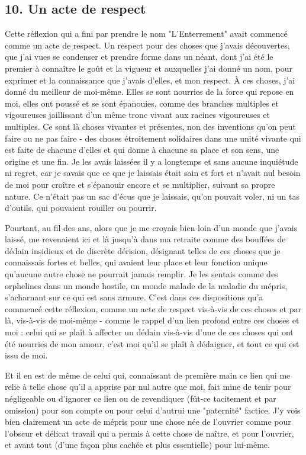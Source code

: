 \subsection{10. Un acte de respect}

Cette réflexion qui a fini par prendre le nom "L'Enterrement" avait commencé comme un acte de respect. Un respect pour des choses que j'avais découvertes, que j'ai vues se condenser et prendre forme dans un néant, dont j'ai été le premier à connaître le goût et la vigueur et auxquelles j'ai donné un nom, pour exprimer et la connaissance que j'avais d'elles, et mon respect. À ces choses, j'ai donné du meilleur de moi-même. Elles se sont nourries de la force qui repose en moi, elles ont poussé et se sont épanouies, comme des branches multiples et vigoureuses jaillissant d'un même tronc vivant aux racines vigoureuses et multiples. Ce sont là choses vivantes et présentes, non des inventions qu'on peut faire ou ne pas faire - des choses étroitement solidaires dans une unité vivante qui est faite de chacune d'elles et qui donne à chacune sa place et son sens, une origine et une fin. Je les avais laissées il y a longtemps et sans aucune inquiétude ni regret, car je savais que ce que je laissais était sain et fort et n'avait nul besoin de moi pour croître et s'épanouir encore et se multiplier, suivant sa propre nature. Ce n'était pas un sac d'écus que je laissais, qu'on pouvait voler, ni un tas d'outils, qui pouvaient rouiller ou pourrir.

Pourtant, au fil des ans, alors que je me croyais bien loin d'un monde que j'avais laissé, me revenaient ici et là jusqu'à dans ma retraite comme des bouffées de dédain insidieux et de discrète dérision, désignant telles de ces choses que je connaissais fortes et belles, qui avaient leur place et leur fonction unique qu'aucune autre chose ne pourrait jamais remplir. Je les sentais comme des orphelines dans un monde hostile, un monde malade de la maladie du mépris, s'acharnant sur ce qui est sans armure. C'est dans ces dispositions qu'a commencé cette réflexion, comme un acte de respect vis-à-vis de ces choses et par là, vis-à-vis de moi-même - comme le rappel d'un lien profond entre ces choses et moi : celui qui se plaît à affecter un dédain vis-à-vis d'une de ces choses qui ont été nourries de mon amour, c'est moi qu'il se plaît à dédaigner, et tout ce qui est issu de moi.

Et il en est de même de celui qui, connaissant de première main ce lien qui me relie à telle chose qu'il a apprise par nul autre que moi, fait mine de tenir pour négligeable ou d'ignorer ce lien ou de revendiquer (fût-ce tacitement et par omission) pour son compte ou pour celui d'autrui une "paternité" factice. J'y vois bien clairement un acte de mépris pour une chose née de l'ouvrier comme pour l'obscur et délicat travail qui a permis à cette chose de naître, et pour l'ouvrier, et avant tout (d'une façon plus cachée et plus essentielle) pour lui-même.

